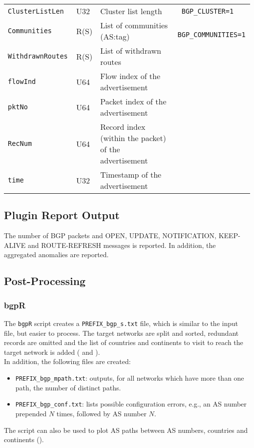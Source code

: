 \documentclass[documentation]{subfiles}
\begin{document}
\begin{longtable}{>{\tt}lll>{\tt\small}l}
    ClusterListLen  & U32    & Cluster list length                                   & BGP\_CLUSTER=1\\
    Communities     & R(S)   & List of communities (AS:tag)                          & BGP\_COMMUNITIES=1\\
    WithdrawnRoutes & R(S)   & List of withdrawn routes                              & \\
    flowInd         & U64    & Flow index of the advertisement                       & \\
    pktNo           & U64    & Packet index of the advertisement                     & \\
    RecNum          & U64    & Record index (within the packet) of the advertisement & \\
    time            & U32    & Timestamp of the advertisement                        & \\
    \bottomrule
\end{longtable}

\subsection{Plugin Report Output}
The number of BGP packets and OPEN, UPDATE, NOTIFICATION, KEEP-ALIVE and ROUTE-REFRESH messages is reported. In addition, the aggregated {\tt{}} anomalies are reported.

\subsection{Post-Processing}

\subsubsection{bgpR}\label{bgpR}
The {\tt bgpR} script creates a {\tt PREFIX\_bgp\_s.txt} file, which is similar to the input file, but easier to process.
The target networks are split and sorted, redundant records are omitted and the list of countries and continents to visit to reach the target network is added ({\tt{}} and {\tt{}}).\\

In addition, the following files are created:
\begin{itemize}
    \item {\tt PREFIX\_bgp\_mpath.txt}: outputs, for all networks which have more than one path, the number of distinct paths.
    \item {\tt PREFIX\_bgp\_conf.txt}: lists possible configuration errors, e.g., an AS number prepended $N$ times, followed by AS number $N$.
\end{itemize}
The script can also be used to plot AS paths between AS numbers, countries and continents ().
\end{document}
